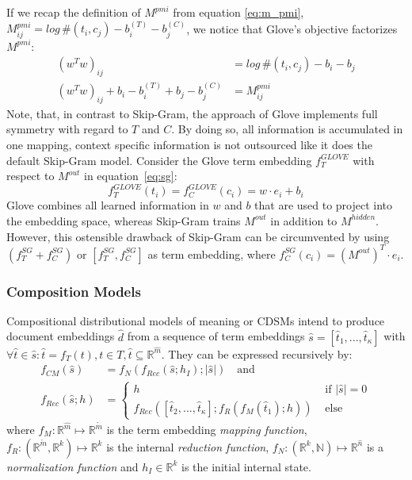 If we recap the definition of $M^{pmi}$ from equation \eqref{eq:m_pmi}, $M^{pmi}_{ij}= log\,\#(t_i, c_j) - b^{(T)}_i - b^{(C)}_j$, we notice that Glove's objective factorizes $M^{pmi}$: %
\begin{align}
(w^Tw)_{ij} & = log\,\#(t_i, c_j) - b_i - b_j \\
(w^Tw)_{ij} + b_i - b^{(T)}_i + b_j - b^{(C)}_j & = M^{pmi}_{ij}
\end{align}
Note, that, in contrast to Skip-Gram, the approach of Glove implements full symmetry with regard to $T$ and $C$. By doing so, all information is accumulated in one mapping, context specific information is not outsourced like it does the default Skip-Gram model. Consider the Glove term embedding $f_T^{GLOVE}$ with respect to $M^{out}$ in equation~\ref{eq:sg}:
\begin{equation}
f_T^{GLOVE}(t_i) = f_C^{GLOVE}(c_i) = w \cdot e_i + b_i 
\end{equation}
Glove combines all learned information in $w$ and $b$ that are used to project into the embedding space, whereas Skip-Gram trains $M^{out}$ in addition to $M^{hidden}$.
However, this ostensible drawback of Skip-Gram can be circumvented by using $(f^{SG}_T + f^{SG}_C)$ or $[f^{SG}_T, f^{SG}_C]$ as term embedding, where $f_C^{SG}(c_i) = (M^{out})^T \cdot e_i$.

\subsubsection{Composition Models}
\label{sec:composition_models}
Compositional distributional models of meaning or \acfp{CDSM} \autocite{clark_compositional_2008,grefenstette_experimental_2011} intend to produce document embeddings $\hat{d}$ from a sequence of term embeddings $\hat{s} = [\hat{t}_1, ..., \hat{t}_\kappa]$ with $\forall \hat{t} \in \hat{s}: \hat{t} = f_T(t), t \in T, \hat{t} \subseteq \mathbb{R}^{\hat{m}}$. They can be expressed recursively by:
\begin{equation}
\begin{split}
f_{CM}(\hat{s}) & = f_N(f_{Rec}(\hat{s}; h_I); |\hat{s}|) \quad \text{and} \\
f_{Rec}(\hat{s}; h) & = 
  \begin{cases}  
    h & \text{ if }|\hat{s}|=0 \\
    f_{Rec}([\hat{t}_2, ..., \hat{t}_\kappa]; f_R(f_M(\hat{t}_1); h)) & \text{ else}
  \end{cases}
\end{split}
\end{equation}
where $f_M: \mathbb{R}^{\hat{m}} \mapsto \mathbb{R}^{\mathring{m}}$ is the term embedding \textit{mapping function}, $f_R: (\mathbb{R}^{\mathring{m}},\mathbb{R}^k) \mapsto \mathbb{R}^k$ is the internal \textit{reduction function}, $f_N: (\mathbb{R}^k, \mathbb{N}) \mapsto \mathbb{R}^{\hat{n}}$ is a \textit{normalization function} and $h_I \in \mathbb{R}^k$ is the initial internal state.

